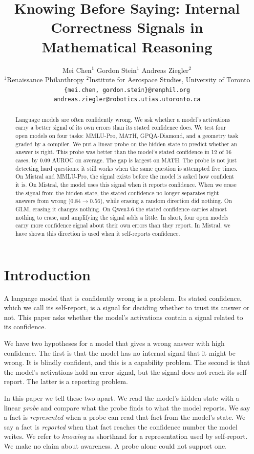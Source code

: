\documentclass{article}
\title{Knowing Before Saying: Internal Correctness Signals in Mathematical Reasoning}
\author{%
  Mei Chen$^{1}$ \quad Gordon Stein$^{1}$ \quad Andreas Ziegler$^{2}$ \\
  $^{1}$Renaissance Philanthropy \quad
  $^{2}$Institute for Aerospace Studies, University of Toronto \\
  {\small\texttt{\{mei.chen, gordon.stein\}@renphil.org} \quad \texttt{andreas.ziegler@robotics.utias.utoronto.ca}}
}
\begin{document}
\maketitle

\begin{abstract}
Language models are often confidently wrong.
We ask whether a model's activations carry a better signal of its own errors than its stated confidence does.
We test four open models on four tasks: MMLU-Pro, MATH, GPQA-Diamond, and a geometry task graded by a compiler.
We put a linear probe on the hidden state to predict whether an answer is right.
This probe was better than the model's stated confidence in 12 of 16 cases, by 0.09 AUROC on average.
The gap is largest on MATH.
The probe is not just detecting hard questions: it still works when the same question is attempted five times.
On Mistral and MMLU-Pro, the signal exists before the model is asked how confident it is.
On Mistral, the model uses this signal when it reports confidence.
When we erase the signal from the hidden state, the stated confidence no longer separates right answers from wrong ($0.84 \to 0.56$), while erasing a random direction did nothing.
On GLM, erasing it changes nothing.
On Qwen3.6 the stated confidence carries almost nothing to erase, and amplifying the signal adds a little.
In short, four open models carry more confidence signal about their own errors than they report.
In Mistral, we have shown this direction is used when it self-reports confidence.
\end{abstract}

\section{Introduction}
\label{sec:intro}

A language model that is confidently wrong is a problem.
Its stated confidence, which we call its self-report, is a signal for deciding whether to trust its answer or not.
This paper asks whether the model's activations contain a signal related to its confidence.

We have two hypotheses for a model that gives a wrong answer with high confidence.
The first is that the model has no internal signal that it might be wrong.
It is blindly confident, and this is a capability problem.
The second is that the model's activations hold an error signal, but the signal does not reach its self-report.
The latter is a reporting problem.

In this paper we tell these two apart.
We read the model's hidden state with a linear \emph{probe} and compare what the probe finds to what the model reports.
We say a fact is \emph{represented} when a probe can read that fact from the model's state.
We say a fact is \emph{reported} when that fact reaches the confidence number the model writes.
We refer to \emph{knowing} as shorthand for a representation used by self-report.
We make no claim about awareness.
A probe alone could not support one.
\end{document}
